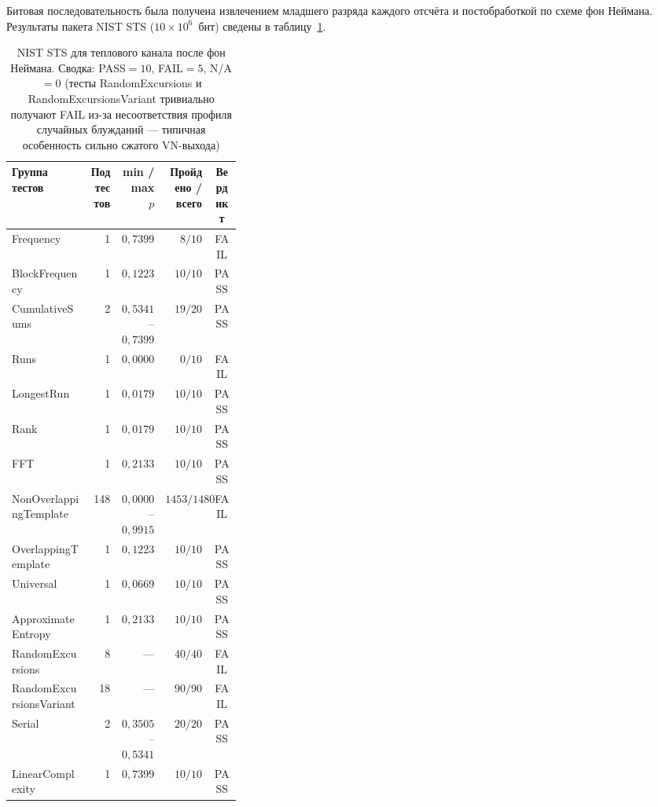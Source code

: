 
Битовая последовательность была получена извлечением младшего разряда каждого
отсчёта и постобработкой по схеме фон Неймана. Результаты пакета NIST STS
($10\times 10^6$~бит) сведены в таблицу~\ref{tab:thermal_new_nist}.

\begin{table}[H]
  \centering
  \footnotesize
  \caption{NIST STS для теплового канала после фон Неймана. Сводка: PASS${}=10$,
  FAIL${}=5$, N/A${}=0$ (тесты RandomExcursions и RandomExcursionsVariant
  тривиально получают FAIL из-за несоответствия профиля случайных блужданий ---
  типичная особенность сильно сжатого VN-выхода)}
  \label{tab:thermal_new_nist}
  \begin{tabular}{|p{0.34\linewidth}|r|r|r|c|}
    \hline
    Группа тестов & Под\-тестов & min / max $p$ & Пройдено / всего & Вердикт \\
    \hline
    Frequency & 1 & $0{,}7399$ & $8/10$ & FAIL \\
    \hline
    BlockFrequency & 1 & $0{,}1223$ & $10/10$ & PASS \\
    \hline
    CumulativeSums & 2 & $0{,}5341$ -- $0{,}7399$ & $19/20$ & PASS \\
    \hline
    Runs & 1 & $0{,}0000$ & $0/10$ & FAIL \\
    \hline
    LongestRun & 1 & $0{,}0179$ & $10/10$ & PASS \\
    \hline
    Rank & 1 & $0{,}0179$ & $10/10$ & PASS \\
    \hline
    FFT & 1 & $0{,}2133$ & $10/10$ & PASS \\
    \hline
    NonOverlappingTemplate & 148 & $0{,}0000$ -- $0{,}9915$ & $1453/1480$ & FAIL \\
    \hline
    OverlappingTemplate & 1 & $0{,}1223$ & $10/10$ & PASS \\
    \hline
    Universal & 1 & $0{,}0669$ & $10/10$ & PASS \\
    \hline
    ApproximateEntropy & 1 & $0{,}2133$ & $10/10$ & PASS \\
    \hline
    RandomExcursions & 8 & --- & $40/40$ & FAIL \\
    \hline
    RandomExcursionsVariant & 18 & --- & $90/90$ & FAIL \\
    \hline
    Serial & 2 & $0{,}3505$ -- $0{,}5341$ & $20/20$ & PASS \\
    \hline
    LinearComplexity & 1 & $0{,}7399$ & $10/10$ & PASS \\
    \hline
  \end{tabular}
\end{table}

